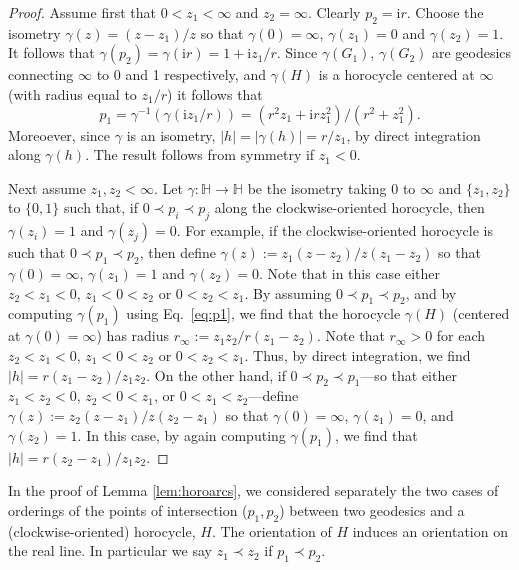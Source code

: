 \documentclass[10pt,a4paper]{article}
\newcommand{\len}[1]{\left\lvert #1 \right\rvert}
\renewcommand{\i}{\mathrm{i}}
\begin{document}
\begin{proof}
   Assume first that $0 < z_1 < \infty$ and $z_2 = \infty$. Clearly $p_2 = \i r$. Choose the isometry $\gamma(z) = (z-z_1)/z$ so that $\gamma(0) = \infty$, $\gamma(z_1) = 0$ and $\gamma(z_2) = 1$. It follows that $\gamma(p_2) = \gamma(\i r) = 1 + \i z_1/r$. Since $\gamma(G_1)$, $\gamma(G_2)$ are geodesics connecting $\infty$ to 0 and 1 respectively, and $\gamma(H)$ is a horocycle centered at $\infty$ (with radius equal to $z_1/r$) it follows that 
   \begin{equation}
   \label{eq:p1}
       p_1 = \gamma^{-1}(\gamma(\i z_1/r)) =( r^2 z_1 + \i r z_1^2)/(r^2+z_1^2).
   \end{equation}
   Moreoever, since $\gamma$ is an isometry, $\len{h} = \len{\gamma(h)} = r/z_1$, by direct integration along $\gamma(h)$. The result follows from symmetry if $z_1 < 0$.
   
   Next assume $z_1, z_2 < \infty$. Let $\gamma: \mathbb{H} \rightarrow \mathbb{H}$ be the isometry taking $0$ to $\infty$ and $\{z_1, z_2\}$ to $\{0, 1\}$ such that, if $0 \prec p_i \prec p_j$ along the clockwise-oriented horocycle, then $\gamma(z_i) = 1$ and $\gamma(z_j)=0$. For example, if the clockwise-oriented horocycle is such that $0 \prec p_1 \prec p_2$, then define $\gamma(z) := z_1 (z - z_2) / z (z_1 - z_2)$ so that $\gamma(0) = \infty$,  $\gamma(z_1) = 1$ and $\gamma(z_2) = 0$. Note that in this case either $z_2 < z_1 < 0$, $z_1 < 0 < z_2$ or $0 < z_2 < z_1$. By assuming $0 \prec p_1 \prec p_2$, and by computing $\gamma(p_1)$ using Eq.\ \eqref{eq:p1}, we find that the horocycle $\gamma(H)$ (centered at $\gamma(0) = \infty$) has radius $r_{\infty} := z_1 z_2 / r (z_1 - z_2)$. Note that $r_{\infty} > 0$ for each $z_2 < z_1 < 0$, $z_1 < 0 < z_2$ or $0 < z_2 < z_1$. Thus, by direct integration, we find $\len{h} = r(z_1 - z_2)/z_1 z_2$.  On the other hand, if $0 \prec p_2 \prec p_1$---so that either $z_1 < z_2 < 0$, $z_2 < 0 < z_1$, or $0< z_1 < z_2$---define $\gamma(z) := z_2 (z - z_1) / z (z_2-z_1)$ so that $\gamma(0) = \infty$, $\gamma(z_1) = 0$, and $\gamma(z_2) = 1$. In this case, by again computing $\gamma(p_1)$, we find that $\len{h} = r(z_2 - z_1)/z_1z_2$. 
\end{proof}

In the proof of Lemma \ref{lem:horoarcs}, we considered separately the two cases of orderings of the points of intersection ($p_1, p_2$) between two geodesics and a (clockwise-oriented) horocycle, $H$. The orientation of $H$ induces an orientation on the real line. In particular we say $z_1 \prec z_2$ if $p_1 \prec p_2$.
\end{document}
